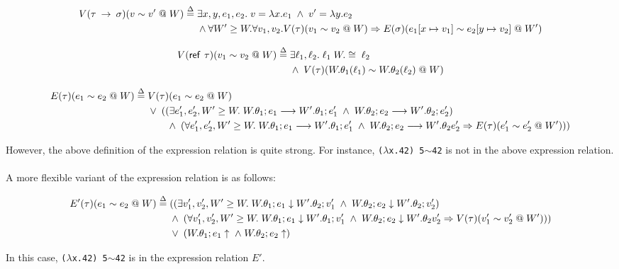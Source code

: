 \documentclass{notes}
\begin{document}
\begin{equation}
  \begin{aligned}
    V(\tau \: \rightarrow \: \sigma)(v \sim v' \; @ \; W) \overset{\Delta}{=} \; & \exists x, y, e_1, e_2 . \; v = \lambda x . e_1 \; \land \; v' = \lambda y . e_2 \\
    & \land \forall W' \geq W. \forall v_1, v_2. V(\tau)(v_1 \sim v_2 \; @ \; W) \Rightarrow E(\sigma)(e_1[x \mapsto v_1] \sim e_2[y \mapsto v_2] \; @ \; W')
  \end{aligned}
\end{equation}

\begin{equation}
  \begin{aligned}
    V(\textsf{ref} \:\: \tau)(v_1 \sim v_2 \; @ \; W) \overset{\Delta}{=} \; & \exists \ell_1, \ell_2 . \; \ell_1 \; W.\cong \; \ell_2 \\
    & \land \; V(\tau)(W.\theta_1(\ell_1) \sim W.\theta_2(\ell_2) \; @ \; W)
  \end{aligned}
\end{equation}

\begin{equation}
  \begin{aligned}
    E(\tau)(e_1 \sim e_2 \; @ \; W) \overset{\Delta}{=} \; & V(\tau)(e_1 \sim e_2 \; @ \; W) \\
    & \lor \; (
      (\exists e_1', e_2', W' \geq W . \; W.\theta_1; e_1 \longrightarrow W'.\theta_1; e_1' \; \land \; W.\theta_2; e_2 \longrightarrow W'.\theta_2; e'_2) \\
      & \; \; \; \; \; \; \; \land \; (\forall e'_1, e'_2, W' \geq W . \; W.\theta_1; e_1 \longrightarrow W'.\theta_1; e'_1 \; \land \; W.\theta_2; e_2 \longrightarrow W'.\theta_2 e'_2 \Rightarrow E(\tau)(e'_1 \sim e'_2 \; @ \; W'))
    )
  \end{aligned}
\end{equation}

\vspace{0.1in}

However, the above definition of the expression relation is quite strong.
For instance, \verb|(|$\lambda$\verb|x.42) 5|\;$\sim$\;\verb|42| is not in the above expression relation. \\ \\
A more flexible variant of the expression relation is as follows:

\begin{equation}
  \begin{aligned}
    E'(\tau)(e_1 \sim e_2 \; @ \; W) \overset{\Delta}{=} \; & (
      (\exists v_1', v_2', W' \geq W . \; W.\theta_1; e_1 \downarrow W'.\theta_2; v_1' \; \land \; W.\theta_2; e_2 \downarrow W'.\theta_2; v'_2) \\
      & \land \; (\forall v'_1, v'_2, W' \geq W . \; W.\theta_1; e_1 \downarrow W'.\theta_1; v'_1 \; \land \; W.\theta_2; e_2 \downarrow W'.\theta_2 v'_2 \Rightarrow V(\tau)(v'_1 \sim v'_2 \; @ \; W'))
    ) \\
    & \lor \; (W.\theta_1; e_1 \uparrow \; \land \; W.\theta_2; e_2 \uparrow)
  \end{aligned}
\end{equation}

In this case, \verb|(|$\lambda$\verb|x.42) 5|\;$\sim$\;\verb|42| is in the expression relation $E'$.
\end{document}
